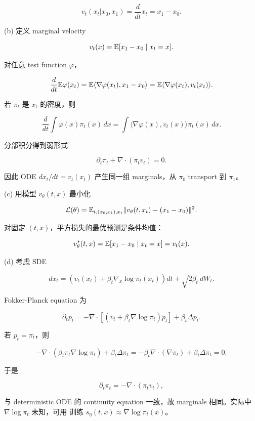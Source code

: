 \[
  v_t(x_t|x_0,x_1)
  =
  \frac{d}{dt}x_t
  =
  x_1-x_0.
\]

(b) 定义 marginal velocity

\[
  v_t(x)=
  \mathbb{E}[x_1-x_0\mid x_t=x].
\]

对任意 test function \(\varphi\)，

\[
  \frac{d}{dt}\mathbb{E}\varphi(x_t)
  =
  \mathbb{E}\langle \nabla\varphi(x_t),x_1-x_0\rangle
  =
  \mathbb{E}\langle \nabla\varphi(x_t),v_t(x_t)\rangle.
\]

若 \(\pi_t\) 是 \(x_t\) 的密度，则

\[
  \frac{d}{dt}\int \varphi(x)\pi_t(x)\,dx
  =
  \int \langle \nabla\varphi(x),v_t(x)\rangle\pi_t(x)\,dx.
\]

分部积分得到弱形式

\[
  \partial_t\pi_t+\nabla\cdot(\pi_t v_t)=0.
\]

因此 ODE \(dx_t/dt=v_t(x_t)\) 产生同一组 marginals，从 \(\pi_0\) transport 到 \(\pi_1\)。

(c) 用模型 \(v_\theta(t,x)\) 最小化

\[
  \mathcal{L}(\theta)
  =
  \mathbb{E}_{t,(x_0,x_1),x_t}
  \|v_\theta(t,x_t)-(x_1-x_0)\|^2.
\]

对固定 \((t,x)\)，平方损失的最优预测是条件均值：

\[
  v_\theta^*(t,x)
  =
  \mathbb{E}[x_1-x_0\mid x_t=x]
  =
  v_t(x).
\]

(d) 考虑 SDE

\[
  dx_t=
  \left(v_t(x_t)+\beta_t\nabla_x\log\pi_t(x_t)\right)dt
  +
  \sqrt{2\beta_t}\,dW_t.
\]

Fokker-Planck equation 为

\[
  \partial_t p_t
  =
  -\nabla\cdot\left[
    \left(v_t+\beta_t\nabla\log\pi_t\right)p_t
  \right]
  +
  \beta_t\Delta p_t.
\]

若 \(p_t=\pi_t\)，则

\[
  -\nabla\cdot(\beta_t\pi_t\nabla\log\pi_t)+\beta_t\Delta\pi_t
  =
  -\beta_t\nabla\cdot(\nabla\pi_t)+\beta_t\Delta\pi_t
  =
  0.
\]

于是

\[
  \partial_t\pi_t=-\nabla\cdot(\pi_t v_t),
\]

与 deterministic ODE 的 continuity equation 一致，故 marginals 相同。实际中 \(\nabla\log\pi_t\) 未知，可用  训练 \(s_\eta(t,x)\approx \nabla\log\pi_t(x)\)。

